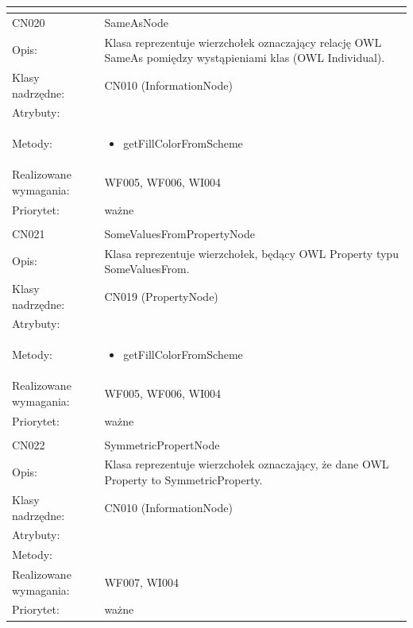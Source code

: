 \documentclass[a4paper,10pt]{article}
\begin{document}
\begin{center}
\begin{longtable}{|m{3cm}|m{9cm}|}
\multicolumn{2}{c}{} \\
 \hline

CN020 & SameAsNode \\ \hline
Opis: & Klasa reprezentuje wierzchołek oznaczający relację OWL SameAs pomiędzy wystąpieniami klas (OWL Individual).    \\ \hline
Klasy nadrzędne: & CN010 (InformationNode)     \\ \hline
Atrybuty: & %
 \\ \hline
Metody: & \begin{itemize}
 \item getFillColorFromScheme
\end{itemize}
  \\ \hline
Realizowane wymagania: & WF005, WF006, WI004 \\ \hline
Priorytet: & ważne  \\ \hline

\multicolumn{2}{c}{} \\
 \hline

CN021 & SomeValuesFromPropertyNode \\ \hline
Opis: & Klasa reprezentuje wierzchołek, będący OWL Property typu SomeValuesFrom. \\ \hline
Klasy nadrzędne: & CN019 (PropertyNode) \\ \hline
Atrybuty: & %
 \\ \hline
Metody: & \begin{itemize}
 \item getFillColorFromScheme
\end{itemize}
  \\ \hline
Realizowane wymagania: & WF005, WF006, WI004 \\ \hline
Priorytet: & ważne  \\ \hline

\multicolumn{2}{c}{} \\
 \hline

CN022 & SymmetricPropertNode \\ \hline
Opis: & Klasa reprezentuje wierzchołek oznaczający, że dane OWL Property to SymmetricProperty.    \\ \hline
Klasy nadrzędne: & CN010 (InformationNode)     \\ \hline
Atrybuty: & %
 \\ \hline
Metody: & %
  \\ \hline
Realizowane wymagania: & WF007, WI004 \\ \hline
Priorytet: & ważne  \\ \hline


\end{longtable}
\end{center}
\end{document}

